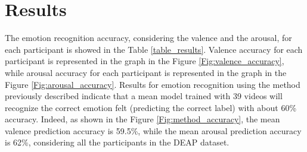 \documentclass[10pt,journal,A4paper,compsoc,epsfig]{IEEEtran}
\begin{document}
\section{Results}
The emotion recognition accuracy, considering the valence and the arousal, for each participant is showed in the Table \ref{table_results}. Valence accuracy for each participant is represented in the graph in the Figure \ref{Fig:valence_accuracy}, while arousal accuracy for each participant is represented in the graph in the Figure \ref{Fig:arousal_accuracy}. 
Results for emotion recognition using the method previously described indicate that a mean model trained with 39 videos will recognize the correct emotion felt (predicting the correct label) with about 60\% accuracy. Indeed, as shown in the Figure \ref{Fig:method_accuracy}, the mean valence prediction accuracy is 59.5\%, while the mean arousal prediction accuracy is 62\%, considering all the participants in the DEAP dataset.
\end{document}
